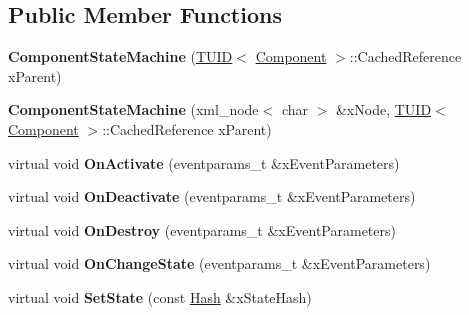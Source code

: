 \subsection*{Public Member Functions}
\begin{DoxyCompactItemize}
\item 
\hypertarget{class_k_g_e_1_1_component_state_machine_a746c723bc378d677011aa4b53f88bcbe}{{\bfseries Component\-State\-Machine} (\hyperlink{class_k_g_e_1_1_t_u_i_d}{T\-U\-I\-D}$<$ \hyperlink{class_k_g_e_1_1_component}{Component} $>$\-::Cached\-Reference x\-Parent)}\label{class_k_g_e_1_1_component_state_machine_a746c723bc378d677011aa4b53f88bcbe}

\item 
\hypertarget{class_k_g_e_1_1_component_state_machine_a904e7640f0987d5efee2555976df811d}{{\bfseries Component\-State\-Machine} (xml\-\_\-node$<$ char $>$ \&x\-Node, \hyperlink{class_k_g_e_1_1_t_u_i_d}{T\-U\-I\-D}$<$ \hyperlink{class_k_g_e_1_1_component}{Component} $>$\-::Cached\-Reference x\-Parent)}\label{class_k_g_e_1_1_component_state_machine_a904e7640f0987d5efee2555976df811d}

\item 
\hypertarget{class_k_g_e_1_1_component_state_machine_a65dbfbf05f45eb56cfe9a2f347f7c7c4}{virtual void {\bfseries On\-Activate} (eventparams\-\_\-t \&x\-Event\-Parameters)}\label{class_k_g_e_1_1_component_state_machine_a65dbfbf05f45eb56cfe9a2f347f7c7c4}

\item 
\hypertarget{class_k_g_e_1_1_component_state_machine_a93ec82209352e3f96d010bc457c8f22d}{virtual void {\bfseries On\-Deactivate} (eventparams\-\_\-t \&x\-Event\-Parameters)}\label{class_k_g_e_1_1_component_state_machine_a93ec82209352e3f96d010bc457c8f22d}

\item 
\hypertarget{class_k_g_e_1_1_component_state_machine_a98d710868fd9ec049a4852be56e6c35c}{virtual void {\bfseries On\-Destroy} (eventparams\-\_\-t \&x\-Event\-Parameters)}\label{class_k_g_e_1_1_component_state_machine_a98d710868fd9ec049a4852be56e6c35c}

\item 
\hypertarget{class_k_g_e_1_1_component_state_machine_ad52c88d8693f44464609e365787dd22a}{virtual void {\bfseries On\-Change\-State} (eventparams\-\_\-t \&x\-Event\-Parameters)}\label{class_k_g_e_1_1_component_state_machine_ad52c88d8693f44464609e365787dd22a}

\item 
\hypertarget{class_k_g_e_1_1_component_state_machine_a0f5e40be63810f0566219a725f725f5b}{virtual void {\bfseries Set\-State} (const \hyperlink{class_k_g_e_1_1_hash}{Hash} \&x\-State\-Hash)}\label{class_k_g_e_1_1_component_state_machine_a0f5e40be63810f0566219a725f725f5b}

\end{DoxyCompactItemize}
